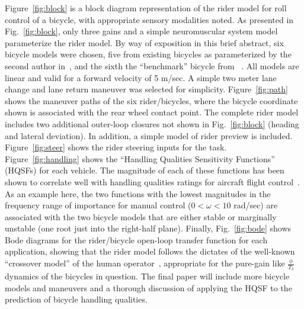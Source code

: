 \documentclass{bmd2010a}
\begin{document}
Figure~\ref{fig:block} is a block diagram representation of the
rider model for roll control of a bicycle, with appropriate sensory modalities
noted. As presented in Fig.~\ref{fig:block}, only three gains and a simple neuromuscular
system model parameterize the rider model. By way of exposition in this brief
abstract, six bicycle models were chosen, five from existing bicycles as
parameterized by the second author in~\cite{Moore2010}, and the sixth the ``benchmark'' bicycle from
~\cite{Meijaard2007}. All models are linear and valid for a forward velocity of 5 m/sec. A
simple two meter lane change and lane return maneuver was selected for simplicity.
Figure~\ref{fig:path} shows the maneuver paths of the six rider/bicycles, where the bicycle
coordinate shown is associated with the rear wheel contact point. The complete
rider model includes two additional outer-loop closures not shown in
Fig.~\ref{fig:block} (heading and lateral deviation). In addition, a simple model of rider preview
is included. Figure~\ref{fig:steer} shows the rider steering inputs for the
task. Figure~\ref{fig:handling} shows the ``Handling Qualities Sensitivity
Functions'' (HQSFs) for each vehicle.
The magnitude of each of these functions has been shown to correlate well with
handling qualities ratings for aircraft flight control~\cite{Hess2006}. As an example here,
the two functions with the lowest magnitudes in the frequency range of
importance for manual control ($0<\omega<10$ rad/sec) are associated with the two
bicycle models that are either stable or marginally unstable (one root just
into the right-half plane). Finally, Fig.~\ref{fig:bode} shows Bode diagrams for the
rider/bicycle open-loop transfer function for each application, showing that
the rider model follows the dictates of the well-known ``crossover model'' of the
human operator~\cite{McRuer1974}, appropriate for the pure-gain like
$\frac{\phi}{T_\delta}$ dynamics of the
bicycles in question. The final paper will include more bicycle models and
maneuvers and a thorough discussion of applying the HQSF to the prediction of
bicycle handling qualities.
\end{document}
